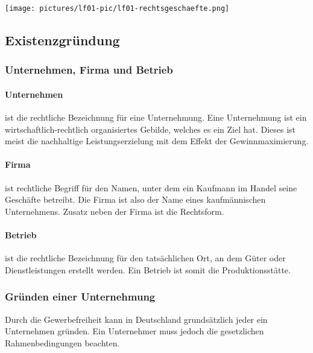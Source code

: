 \texttt{[image: pictures/lf01-pic/lf01-rechtsgeschaefte.png]} 


\subsection{Existenzgründung}
\subsubsection{Unternehmen, Firma und Betrieb}
	\paragraph{Unternehmen} ist die rechtliche Bezeichnung für eine Unternehmung. Eine 		Unternehmung ist ein wirtschaftlich-rechtlich organisiertes Gebilde, welches es ein Ziel hat. Dieses ist meist die nachhaltige Leistungserzielung mit dem Effekt der Gewinnmaximierung.
	\paragraph{Firma} ist rechtliche Begriff für den Namen, unter dem ein Kaufmann im Handel seine Geschäfte betreibt. Die Firma ist also der Name eines kaufmännischen Unternehmens. Zusatz neben der Firma ist die Rechtsform.
	\paragraph{Betrieb} ist die rechtliche Bezeichnung für den tatsächlichen Ort, an dem Güter oder Dienstleistungen erstellt werden. Ein Betrieb ist somit die Produktionsstätte.

\subsubsection{Gründen einer Unternehmung}
Durch die Gewerbefreiheit kann in Deutschland grundsätzlich jeder ein Unternehmen gründen. Ein Unternehmer muss jedoch die gesetzlichen Rahmenbedingungen beachten.

